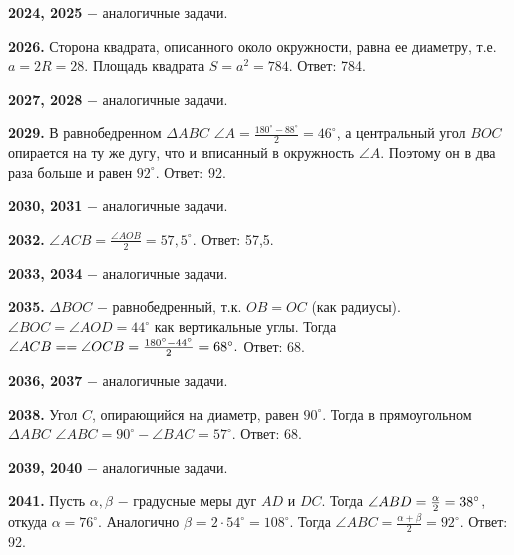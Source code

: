 \textbf{2024, 2025} $-$ аналогичные задачи.

\textbf{2026.} Сторона квадрата, описанного около окружности, равна ее диаметру, т.е. $a = 2R = 28$. Площадь квадрата $S = a^2 = 784$. \newline \null \hspace*{\fill} Ответ: 784.

\clearpage 

\textbf{2027, 2028} $-$ аналогичные задачи.

\textbf{2029.} В равнобедренном $\Delta ABC$ $\angle A = \frac{180^\circ - 88^\circ}{2} = 46^\circ$, а центральный угол $BOC$ опирается на ту же дугу, что и вписанный в окружность $\angle A$. Поэтому он в два раза больше и равен $92^\circ$. \newline \null \hspace*{\fill} Ответ: 92.

\textbf{2030, 2031} $-$ аналогичные задачи.

\textbf{2032.} $\angle ACB = \frac{\angle AOB}{2} = 57,5^\circ$. \newline \null \hspace*{\fill} Ответ: 57,5.

\textbf{2033, 2034} $-$ аналогичные задачи.

\textbf{2035.} $\Delta BOC$ $-$ равнобедренный, т.к. $OB=OC$ (как радиусы). $\angle BOC = \angle AOD = 44^\circ$ как вертикальные углы. Тогда $\angle ACB = \linebreak = \angle OCB = \frac{180^\circ-44^\circ}{2} = 68^\circ.$ \newline \null \hspace*{\fill} Ответ: 68.

\textbf{2036, 2037} $-$ аналогичные задачи.

\textbf{2038.} Угол $C$, опирающийся на диаметр, равен $90^\circ$. Тогда в прямоугольном $\Delta ABC$ $\angle ABC = 90^\circ - \angle BAC = 57^\circ.$ \newline \null \hspace*{\fill} Ответ: 68.

\textbf{2039, 2040} $-$ аналогичные задачи.

\textbf{2041.} Пусть $\alpha, \beta$ $-$  градусные меры дуг $AD$ и $DC$. Тогда $\newline\angle ABD =  \frac{\alpha}{2} = 38^\circ$, откуда $\alpha = 76^\circ$. Аналогично $\beta = 2 \cdot 54^\circ = 108^\circ$.
Тогда $\angle ABC = \frac{\alpha + \beta}{2} = 92^\circ$. \newline \null \hspace*{\fill} Ответ: 92.

